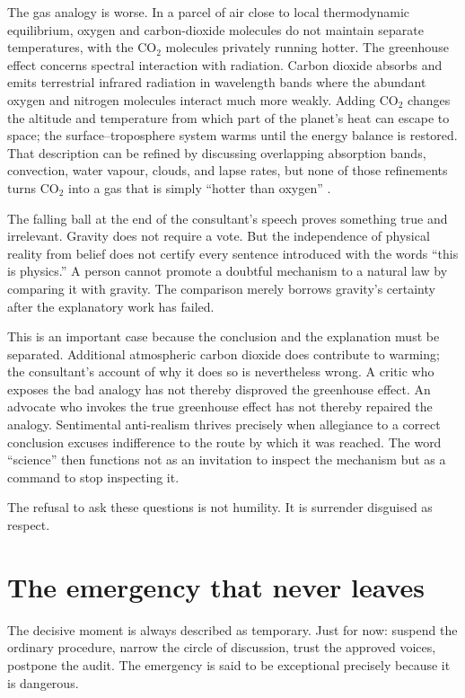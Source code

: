 ﻿\documentclass[12pt,a4paper]{book}
\begin{document}
The gas analogy is worse.  In a parcel of air close to local thermodynamic
equilibrium, oxygen and carbon-dioxide molecules do not maintain separate
temperatures, with the CO$_2$ molecules privately running hotter.  The
greenhouse effect concerns spectral interaction with radiation.  Carbon
dioxide absorbs and emits terrestrial infrared radiation in wavelength bands
where the abundant oxygen and nitrogen molecules interact much more weakly.
Adding CO$_2$ changes the altitude and temperature from which part of the
planet's heat can escape to space; the surface--troposphere system warms until
the energy balance is restored.  That description can be refined by discussing
overlapping absorption bands, convection, water vapour, clouds, and lapse
rates, but none of those refinements turns CO$_2$ into a gas that is simply
``hotter than oxygen'' \cite{IPCCWGI2021TechnicalSummary}.

The falling ball at the end of the consultant's speech proves something true
and irrelevant.  Gravity does not require a vote.  But the independence of
physical reality from belief does not certify every sentence introduced with
the words ``this is physics.''  A person cannot promote a doubtful mechanism
to a natural law by comparing it with gravity.  The comparison merely borrows
gravity's certainty after the explanatory work has failed.

This is an important case because the conclusion and the explanation must be
separated.  Additional atmospheric carbon dioxide does contribute to warming;
the consultant's account of why it does so is nevertheless wrong.  A critic
who exposes the bad analogy has not thereby disproved the greenhouse effect.
An advocate who invokes the true greenhouse effect has not thereby repaired
the analogy.  Sentimental anti-realism thrives precisely when allegiance to a
correct conclusion excuses indifference to the route by which it was reached.
The word ``science'' then functions not as an invitation to inspect the
mechanism but as a command to stop inspecting it.

The refusal to ask these questions is not humility. It is surrender disguised
as respect.

\section{The emergency that never leaves}

The decisive moment is always described as temporary. Just for now: suspend
the ordinary procedure, narrow the circle of discussion, trust the approved
voices, postpone the audit. The emergency is said to be exceptional precisely
because it is dangerous.
\end{document}
